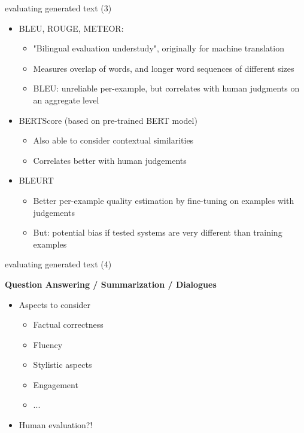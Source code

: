 \begin{vbframe}{evaluating generated text (3)}

\vfill

\begin{itemize}
	\item BLEU, ROUGE, METEOR:
			\begin{itemize}
				\item "Bilingual evaluation understudy", originally for machine translation
				\item Measures overlap of words, and longer word sequences of different sizes
				\item BLEU: unreliable per-example, but correlates with human judgments on an aggregate level 
			\end{itemize}
	\item BERTScore (based on pre-trained BERT model)
			\begin{itemize}
				\item Also able to consider contextual similarities
				\item Correlates better with human judgements
			\end{itemize}
	\item BLEURT
			\begin{itemize}
				\item Better per-example quality estimation by fine-tuning on examples with judgements
				\item But: potential bias if tested systems are very different than training examples
			\end{itemize}
\end{itemize}

\vfill

\end{vbframe}


\begin{vbframe}{evaluating generated text (4)}

\vfill

\textbf{Question Answering / Summarization / Dialogues}

\begin{itemize}
	\item Aspects to consider
			\begin{itemize}
				\item Factual correctness
				\item Fluency
				\item Stylistic aspects
				\item Engagement
				\item ...
			\end{itemize}
	\item Human evaluation?!
\end{itemize}

\vfill

\end{vbframe}

